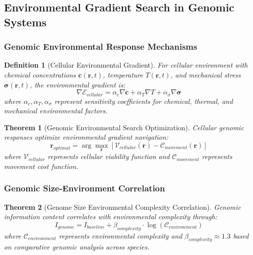 \documentclass[12pt,a4paper]{article}
\newtheorem{theorem}{Theorem}
\newtheorem{definition}{Definition}
\begin{document}
\subsection{Environmental Gradient Search in Genomic Systems}

\subsubsection{Genomic Environmental Response Mechanisms}

\begin{definition}[Cellular Environmental Gradient]
For cellular environment with chemical concentrations $\mathbf{c}(\mathbf{r}, t)$, temperature $T(\mathbf{r}, t)$, and mechanical stress $\boldsymbol{\sigma}(\mathbf{r}, t)$, the environmental gradient is:
\begin{equation}
\nabla \mathcal{E}_{cellular} = \alpha_c \nabla \mathbf{c} + \alpha_T \nabla T + \alpha_\sigma \nabla \boldsymbol{\sigma}
\end{equation}
where $\alpha_c, \alpha_T, \alpha_\sigma$ represent sensitivity coefficients for chemical, thermal, and mechanical environmental factors.
\end{definition}

\begin{theorem}[Genomic Environmental Search Optimization]
Cellular genomic responses optimize environmental gradient navigation:
\begin{equation}
\mathbf{r}_{optimal} = \arg\max_{\mathbf{r}} \left[ \mathcal{V}_{cellular}(\mathbf{r}) - \mathcal{C}_{movement}(\mathbf{r}) \right]
\end{equation}
where $\mathcal{V}_{cellular}$ represents cellular viability function and $\mathcal{C}_{movement}$ represents movement cost function.
\end{theorem}

\subsubsection{Genomic Size-Environment Correlation}

\begin{theorem}[Genome Size Environmental Complexity Correlation]
Genomic information content correlates with environmental complexity through:
\begin{equation}
I_{genome} = I_{baseline} + \beta_{complexity} \cdot \log(\mathcal{C}_{environment})
\end{equation}
where $\mathcal{C}_{environment}$ represents environmental complexity and $\beta_{complexity} \approx 1.3$ based on comparative genomic analysis across species.
\end{theorem}
\end{document}

